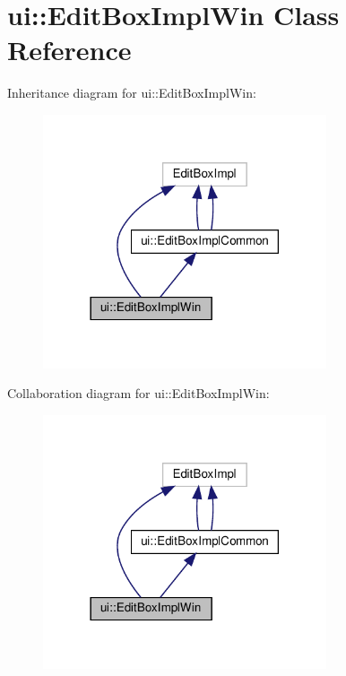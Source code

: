 \hypertarget{classui_1_1EditBoxImplWin}{}\section{ui\+:\+:Edit\+Box\+Impl\+Win Class Reference}
\label{classui_1_1EditBoxImplWin}


Inheritance diagram for ui\+:\+:Edit\+Box\+Impl\+Win\+:
\nopagebreak
\begin{figure}[H]
\begin{center}
\leavevmode
\includegraphics[width=237pt]{classui_1_1EditBoxImplWin__inherit__graph}
\end{center}
\end{figure}


Collaboration diagram for ui\+:\+:Edit\+Box\+Impl\+Win\+:
\nopagebreak
\begin{figure}[H]
\begin{center}
\leavevmode
\includegraphics[width=237pt]{classui_1_1EditBoxImplWin__coll__graph}
\end{center}
\end{figure}
